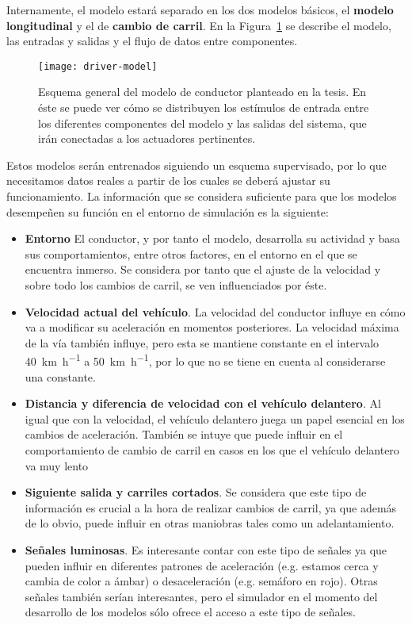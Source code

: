 Internamente, el modelo estará separado en los dos modelos básicos, el \textbf{modelo longitudinal} y el de \textbf{cambio de carril}. En la Figura~\ref{fig:overall-driver-model-schema} se describe el modelo, las entradas y salidas y el flujo de datos entre componentes.

\begin{figure}[t]
	\centering
	\texttt{[image: driver-model]}
	\caption[Esquema general del modelo de conductor planteado]{Esquema general del modelo de conductor planteado en la tesis. En éste se puede ver cómo se distribuyen los estímulos de entrada entre los diferentes componentes del modelo y las salidas del sistema, que irán conectadas a los actuadores pertinentes.}
	\label{fig:overall-driver-model-schema}
\end{figure}

Estos modelos serán entrenados siguiendo un esquema supervisado, por lo que necesitamos datos reales a partir de los cuales se deberá ajustar su funcionamiento. La información que se considera suficiente para que los modelos desempeñen su función en el entorno de simulación es la siguiente:

\begin{itemize}
	\item \textbf{Entorno} El conductor, y por tanto el modelo, desarrolla su actividad y basa sus comportamientos, entre otros factores, en el entorno en el que se encuentra inmerso. Se considera por tanto que el ajuste de la velocidad y sobre todo los cambios de carril, se ven influenciados por éste.
	\item \textbf{Velocidad actual del vehículo}. La velocidad del conductor influye en cómo va a modificar su aceleración en momentos posteriores. La velocidad máxima de la vía también influye, pero esta se mantiene constante en el intervalo \SI{40}{\kilo\meter\per\hour} a \SI{50}{\kilo\meter\per\hour}, por lo que no se tiene en cuenta al considerarse una constante.
	\item \textbf{Distancia y diferencia de velocidad con el vehículo delantero}. Al igual que con la velocidad, el vehículo delantero juega un papel esencial en los cambios de aceleración. También se intuye que puede influir en el comportamiento de cambio de carril en casos en los que el vehículo delantero va muy lento
	\item \textbf{Siguiente salida y carriles cortados}. Se considera que este tipo de información es crucial a la hora de realizar cambios de carril, ya que además de lo obvio, puede influir en otras maniobras tales como un adelantamiento.
	\item \textbf{Señales luminosas}. Es interesante contar con este tipo de señales ya que pueden influir en diferentes patrones de aceleración (e.g. estamos cerca y cambia de color a ámbar) o desaceleración (e.g. semáforo en rojo). Otras señales también serían interesantes, pero el simulador en el momento del desarrollo de los modelos sólo ofrece el acceso a este tipo de señales.
\end{itemize}

